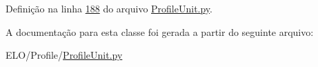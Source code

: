 Definição na linha \hyperlink{ProfileUnit_8py_source_l00188}{188} do arquivo \hyperlink{ProfileUnit_8py_source}{Profile\-Unit.\-py}.



A documentação para esta classe foi gerada a partir do seguinte arquivo\-:\begin{DoxyCompactItemize}
\item 
E\-L\-O/\-Profile/\hyperlink{ProfileUnit_8py}{Profile\-Unit.\-py}\end{DoxyCompactItemize}
